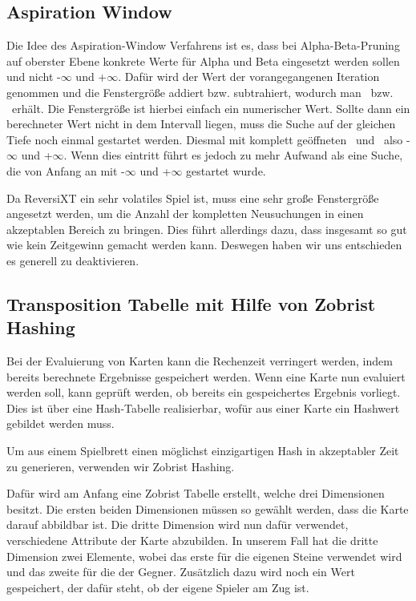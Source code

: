 \documentclass[12pt,a4paper,bibliography=totocnumbered,listof=totocnumbered]{article}
\begin{document}
\subsection{Aspiration Window}
Die Idee des Aspiration-Window Verfahrens ist es, dass bei Alpha-Beta-Pruning auf oberster Ebene konkrete Werte für Alpha und Beta eingesetzt werden sollen und nicht -$\infty$ und +$\infty$.
Dafür wird der Wert der vorangegangenen Iteration genommen und die Fenstergröße addiert bzw. subtrahiert, wodurch man \textalpha\ bzw. \textbeta\ erhält. Die Fenstergröße ist hierbei einfach ein numerischer Wert.
Sollte dann ein berechneter Wert nicht in dem Intervall liegen, muss die Suche auf der gleichen Tiefe noch einmal gestartet werden. Diesmal mit komplett geöffneten \textalpha\ und \textbeta\ also -$\infty$ und +$\infty$. Wenn dies eintritt führt es jedoch zu mehr Aufwand als eine Suche, die von Anfang an mit -$\infty$ und +$\infty$ gestartet wurde.

Da ReversiXT ein sehr volatiles Spiel ist, muss eine sehr große Fenstergröße angesetzt werden, um die Anzahl der kompletten Neusuchungen in einen akzeptablen Bereich zu bringen. Dies führt allerdings dazu, dass insgesamt so gut wie kein Zeitgewinn gemacht werden kann.
Deswegen haben wir uns entschieden es generell zu deaktivieren.

\subsection{Transposition Tabelle mit Hilfe von Zobrist Hashing}
Bei der Evaluierung von Karten kann die Rechenzeit verringert werden, indem bereits berechnete Ergebnisse gespeichert werden. Wenn eine Karte nun evaluiert werden soll, kann geprüft werden, ob bereits ein gespeichertes Ergebnis vorliegt. Dies ist über eine Hash-Tabelle realisierbar, wofür aus einer Karte ein Hashwert gebildet werden muss.

Um aus einem Spielbrett einen möglichst einzigartigen Hash in akzeptabler Zeit zu generieren, verwenden wir Zobrist Hashing.

Dafür wird am Anfang eine Zobrist Tabelle erstellt, welche drei Dimensionen besitzt. Die ersten beiden Dimensionen müssen so gewählt werden, dass die Karte darauf abbildbar ist. Die dritte Dimension wird nun dafür verwendet, verschiedene Attribute der Karte abzubilden. In unserem Fall hat die dritte Dimension zwei Elemente, wobei das erste für die eigenen Steine verwendet wird und das zweite für die der Gegner. Zusätzlich dazu wird noch ein Wert gespeichert, der dafür steht, ob der eigene Spieler am Zug ist.
\end{document}
